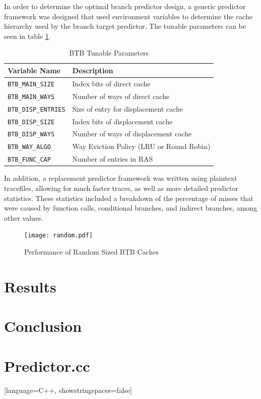 \documentclass[twocolumn]{article}
\newcommand{\centerimage}[3]{
\begin{figure}[ht!]  
\begin{center}
#1
\caption{#2}
\label{#3}
\end{center}
\end{figure}}
\begin{document}
In order to determine the optimal branch predictor design, a generic
predictor framework was designed that used environment variables to
determine the cache hierarchy used by the branch target predictor.
The tunable parameters can be seen in table \ref{envars}. 

\begin{table}
\begin{center}\begin{tabular}{p{}p{}}
Variable Name & Description \\
\hline
\texttt{BTB\_MAIN\_SIZE} & Index bits of direct cache \\
\texttt{BTB\_MAIN\_WAYS} & Number of ways of direct cache \\
\texttt{BTB\_DISP\_ENTRIES} & Size of entry for displacement cache \\
\texttt{BTB\_DISP\_SIZE} & Index bits of displacement cache \\
\texttt{BTB\_DISP\_WAYS} & Number of ways of displacement cache \\
\texttt{BTB\_WAY\_ALGO} & Way Eviction Policy (LRU or Round Robin) \\
\texttt{BTB\_FUNC\_CAP} & Number of entries in RAS
\end{tabular}\end{center}
\caption{BTB Tunable Parameters}
\label{envars}
\end{table}

In addition, a replacement predictor framework was written using
plaintext tracefiles, allowing for much faster traces, as well as more
detailed predictor statistics. These statistics included a breakdown of
the percentage of misses that were caused by function calls,
conditional branches, and indirect branches, among other values. 


\centerimage{\texttt{[image: random.pdf]}}{Performance
  of Random Sized BTB Caches}{bgraph}
\section{Results}
\section{Conclusion}
\newpage
\onecolumn
\section{Predictor.cc}
[language=C++, showstringspaces=false]
\end{document}
